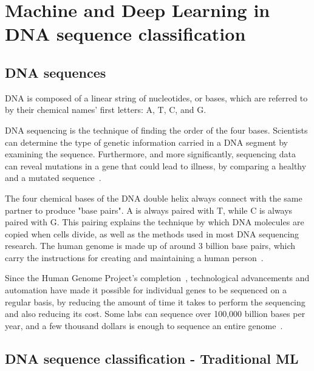 \chapter{Machine and Deep Learning in DNA sequence classification} \label{sec:dna_sequences}

\section{DNA sequences} \label{subsec:what_are_dna_sequences}

\gls{DNA} is composed of a linear string of nucleotides, or bases, which are referred to by their chemical names' first letters: \gls{A}, \gls{T}, \gls{C}, and \gls{G}. 

\gls{DNA} sequencing is the technique of finding the order of the four bases. Scientists can determine the type of genetic information carried in a \gls{DNA} segment by examining the sequence. Furthermore, and more significantly, sequencing data can reveal mutations in a gene that could lead to illness, by comparing a healthy and a mutated sequence~\cite{2020DNASheet}.

The four chemical bases of the \gls{DNA} double helix always connect with the same partner to produce "base pairs". \gls{A} is always paired with \gls{T}, while \gls{C} is always paired with \gls{G}. This pairing explains the technique by which \gls{DNA} molecules are copied when cells divide, as well as the methods used in most \gls{DNA} sequencing research. The human \gls{genome} is made up of around 3 billion base pairs, which carry the instructions for creating and maintaining a human person~\cite{2020DNASheet}.

Since the Human Genome Project's completion~\cite{TheProject}, technological advancements and automation have made it possible for individual genes to be sequenced on a regular basis, by reducing the amount of time it takes to perform the sequencing and also reducing its cost. Some labs can sequence over 100,000 billion bases per year, and a few thousand dollars is enough to sequence an entire \gls{genome}~\cite{2020DNASheet}. 

\section{DNA sequence classification - Traditional ML}

